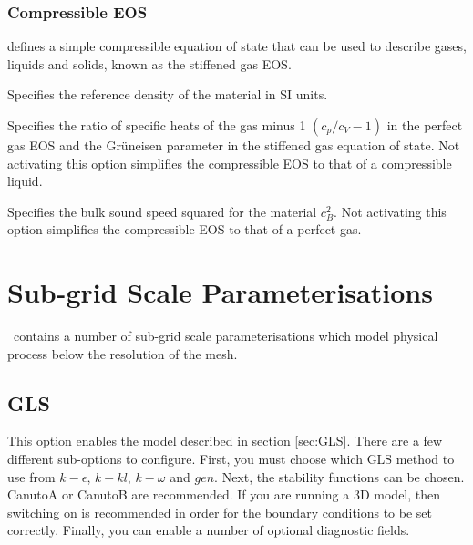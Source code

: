 \subsubsection{Compressible EOS}\label{sec:Multi-material compressible EOS}
 defines a simple compressible equation of state that can be used to describe gases, liquids and solids, known as the stiffened gas EOS. %

\begin{description}
\item{} Specifies the reference density of the material in SI units.
\item{} Specifies the ratio of
  specific heats of the gas minus 1 $(c_p/c_V-1)$ in the perfect gas EOS and the
  Gr\"uneisen parameter in the stiffened gas equation of state. Not activating this option simplifies the compressible EOS to that of a compressible liquid.
\item{} Specifies the bulk sound speed squared for the material $c_B^2$. Not activating this option simplifies the compressible EOS to that of a perfect gas.
\end{description}

\section{Sub-grid Scale Parameterisations}
\label{sec:sub-grid-scale-parameterisations}

\fluidity\ contains a number of sub-grid scale parameterisations which model physical process below the resolution of the mesh.

\subsection{GLS}

This option enables the model described in section \ref{sec:GLS}. There are a few different 
sub-options to configure. First, you must choose which GLS method to use 
from $k-\epsilon$, $k-kl$, $k-\omega$ and $gen$. Next, the stability functions
can be chosen. CanutoA or CanutoB are recommended. If you are running a 3D model, then switching on  
 is recommended in order for the boundary conditions to be set correctly. 
Finally, you can enable a number of optional diagnostic fields.

